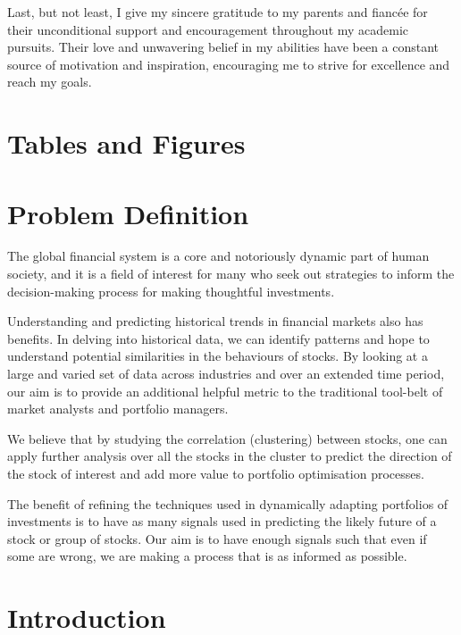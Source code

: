 \documentclass[11pt]{article}
\begin{document}
 Last, but not least, I give my sincere gratitude to my parents and fiancée for their unconditional support and encouragement throughout my academic pursuits. Their love and unwavering belief in my abilities have been a constant source of motivation and inspiration, encouraging me to strive for excellence and reach my goals.
\newpage

\tableofcontents

\newpage

\section{Tables and Figures}

\listoftables

\listoffigures

\newpage

\section{Problem Definition}

The global financial system is a core and notoriously dynamic part of human society, and it is a field of interest for many who seek out strategies to inform the decision-making process for making thoughtful investments. 

Understanding and predicting historical trends in financial markets also has benefits. In delving into historical data, we can identify patterns and hope to understand potential similarities in the behaviours of stocks. By looking at a large and  varied set of data across industries and over an extended time period, our aim is to provide an additional helpful metric to the traditional tool-belt of market analysts and portfolio managers. 

We believe that by studying the correlation (clustering) between stocks, one can apply further analysis over all the stocks in the cluster to predict the direction of the stock of interest and add more value to portfolio optimisation processes. 

The benefit of refining the techniques used in dynamically adapting portfolios of investments is to have as many signals used in predicting the likely future of a stock or group of stocks. Our aim is to have enough signals such that even if some are wrong, we are making a process that is as informed as possible.


\section{Introduction}
\end{document}
